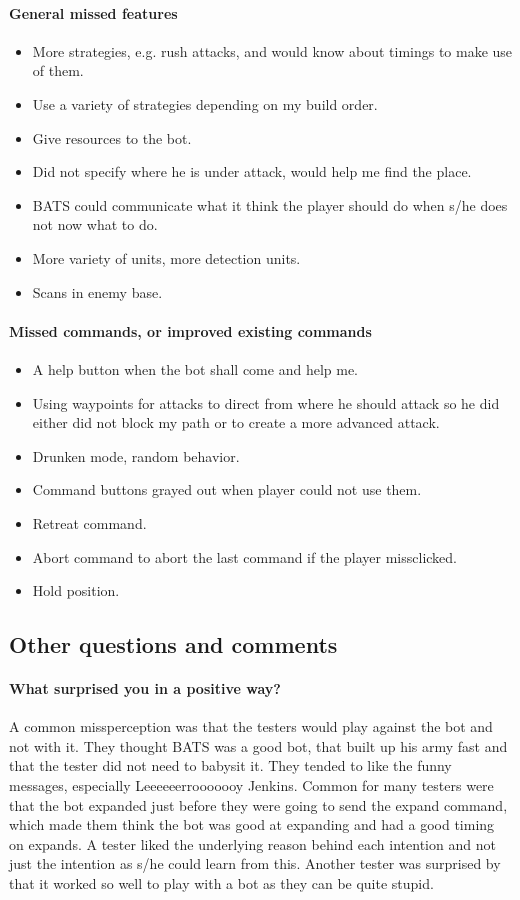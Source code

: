 \paragraph{General missed features}
\begin{itemize}
	\item More strategies, e.g. rush attacks, and would know about timings to make use of them.
	\item Use a variety of strategies depending on my build order.
	\item Give resources to the bot.
	\item Did not specify where he is under attack, would help me find the place.
	\item BATS could communicate what it think the player should do when s/he does not now what to do.
	\item More variety of units, more detection units.
	\item Scans in enemy base.
\end{itemize}

\paragraph{Missed commands, or improved existing commands}
\begin{itemize}
	\item A help button when the bot shall come and help me.
	\item Using waypoints for attacks to direct from where he should attack so he did either did not block my path or to create a more advanced attack.
	\item Drunken mode, random behavior.
	\item Command buttons grayed out when player could not use them.
	\item Retreat command.
	\item Abort command to abort the last command if the player missclicked.
	\item Hold position.
\end{itemize}

\subsection{Other questions and comments}
\paragraph{What surprised you in a positive way?}
A common missperception was that the testers would play against the bot and not with it. They thought BATS was a good bot, that built up his army fast and that the tester did not need to babysit it. They tended to like the funny messages, especially Leeeeeerrooooooy Jenkins. Common for many testers were that the bot expanded just before they were going to send the expand command, which made them think the bot was good at expanding and had a good timing on expands. A tester liked the underlying reason behind each intention and not just the intention as s/he could learn from this. Another tester was surprised by that it worked so well to play with a bot as they can be quite stupid.

